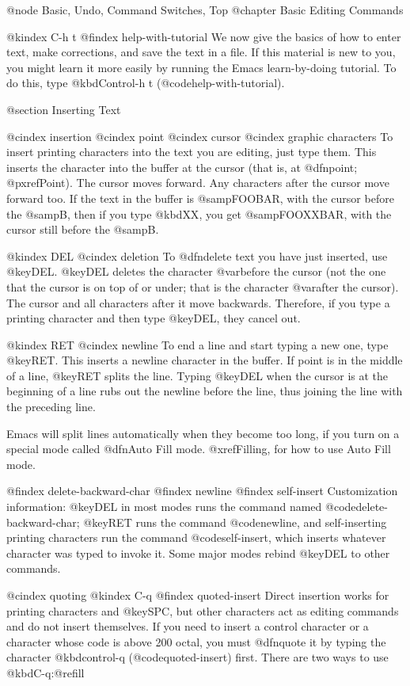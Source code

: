 {{{@node Basic, Undo, Command Switches, Top
@chapter Basic Editing Commands

@kindex C-h t
@findex help-with-tutorial
  We now give the basics of how to enter text, make corrections, and
save the text in a file.  If this material is new to you, you might
learn it more easily by running the Emacs learn-by-doing tutorial.  To
do this, type @kbd{Control-h t} (@code{help-with-tutorial}).

@section Inserting Text

@cindex insertion
@cindex point
@cindex cursor
@cindex graphic characters
  To insert printing characters into the text you are editing, just type
them.  This inserts the character into the buffer at the cursor (that is,
at @dfn{point}; @pxref{Point}).  The cursor moves forward.  Any characters
after the cursor move forward too.  If the text in the buffer is
@samp{FOOBAR}, with the cursor before the @samp{B}, then if you type
@kbd{XX}, you get @samp{FOOXXBAR}, with the cursor still before the
@samp{B}.

@kindex DEL
@cindex deletion
   To @dfn{delete} text you have just inserted, use @key{DEL}.  @key{DEL}
deletes the character @var{before} the cursor (not the one that the cursor
is on top of or under; that is the character @var{after} the cursor).  The
cursor and all characters after it move backwards.  Therefore, if you type
a printing character and then type @key{DEL}, they cancel out.

@kindex RET
@cindex newline
   To end a line and start typing a new one, type @key{RET}.  This inserts
a newline character in the buffer.  If point is in the middle of a line,
@key{RET} splits the line.  Typing @key{DEL} when the cursor is at the
beginning of a line rubs out the newline before the line, thus joining the
line with the preceding line.  

  Emacs will split lines automatically when they become too long, if you
turn on a special mode called @dfn{Auto Fill} mode.  @xref{Filling}, for
how to use Auto Fill mode.

@findex delete-backward-char
@findex newline
@findex self-insert
  Customization information: @key{DEL} in most modes runs the command named
@code{delete-backward-char}; @key{RET} runs the command @code{newline}, and
self-inserting printing characters run the command @code{self-insert},
which inserts whatever character was typed to invoke it.  Some major modes
rebind @key{DEL} to other commands.

@cindex quoting
@kindex C-q
@findex quoted-insert
  Direct insertion works for printing characters and @key{SPC}, but other
characters act as editing commands and do not insert themselves.  If you
need to insert a control character or a character whose code is above 200
octal, you must @dfn{quote} it by typing the character @kbd{control-q}
(@code{quoted-insert}) first.  There are two ways to use @kbd{C-q}:@refill

}}}
